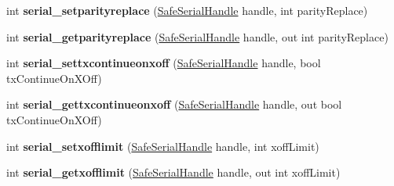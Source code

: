 \begin{DoxyCompactItemize}
int {\bfseries serial\+\_\+setparityreplace} (\mbox{\hyperlink{class_r_j_c_p_1_1_i_o_1_1_ports_1_1_native_1_1_unix_1_1_safe_serial_handle}{Safe\+Serial\+Handle}} handle, int parity\+Replace)
\item 
\mbox{\label{class_r_j_c_p_1_1_i_o_1_1_ports_1_1_native_1_1_unix_1_1_serial_unix_a9ccf00d370404d53fe228f2339589a44}} 
int {\bfseries serial\+\_\+getparityreplace} (\mbox{\hyperlink{class_r_j_c_p_1_1_i_o_1_1_ports_1_1_native_1_1_unix_1_1_safe_serial_handle}{Safe\+Serial\+Handle}} handle, out int parity\+Replace)
\item 
\mbox{\label{class_r_j_c_p_1_1_i_o_1_1_ports_1_1_native_1_1_unix_1_1_serial_unix_a6d81fce86662f58972aed4e3e77e0f49}} 
int {\bfseries serial\+\_\+settxcontinueonxoff} (\mbox{\hyperlink{class_r_j_c_p_1_1_i_o_1_1_ports_1_1_native_1_1_unix_1_1_safe_serial_handle}{Safe\+Serial\+Handle}} handle, bool tx\+Continue\+On\+X\+Off)
\item 
\mbox{\label{class_r_j_c_p_1_1_i_o_1_1_ports_1_1_native_1_1_unix_1_1_serial_unix_a6e80b6b997e8bc8e5e4d0804100a8127}} 
int {\bfseries serial\+\_\+gettxcontinueonxoff} (\mbox{\hyperlink{class_r_j_c_p_1_1_i_o_1_1_ports_1_1_native_1_1_unix_1_1_safe_serial_handle}{Safe\+Serial\+Handle}} handle, out bool tx\+Continue\+On\+X\+Off)
\item 
\mbox{\label{class_r_j_c_p_1_1_i_o_1_1_ports_1_1_native_1_1_unix_1_1_serial_unix_a938f9e55d0221371eadebb88ebee5d9c}} 
int {\bfseries serial\+\_\+setxofflimit} (\mbox{\hyperlink{class_r_j_c_p_1_1_i_o_1_1_ports_1_1_native_1_1_unix_1_1_safe_serial_handle}{Safe\+Serial\+Handle}} handle, int xoff\+Limit)
\item 
\mbox{\label{class_r_j_c_p_1_1_i_o_1_1_ports_1_1_native_1_1_unix_1_1_serial_unix_a2b1d1e215042369c5dcfc4f19025f0d4}} 
int {\bfseries serial\+\_\+getxofflimit} (\mbox{\hyperlink{class_r_j_c_p_1_1_i_o_1_1_ports_1_1_native_1_1_unix_1_1_safe_serial_handle}{Safe\+Serial\+Handle}} handle, out int xoff\+Limit)
\item 

\end{DoxyCompactItemize}

